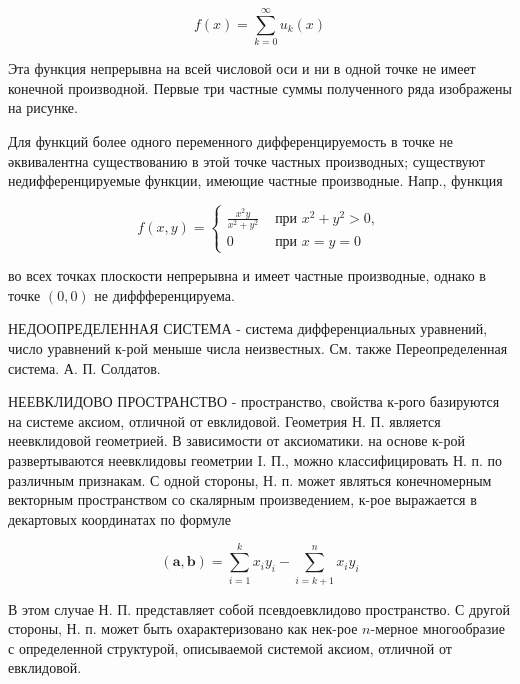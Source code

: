 \documentclass[10pt]{article}
\begin{document}
\[

f(x)=\sum_{k=0}^{\infty} u_{k}(x)

\]



Эта функция непрерывна на всей числовой оси и ни в одной точке не имеет конечной производной. Первые три частные суммы полученного ряда изображены на рисунке.



Для функций более одного переменного дифференцируемость в точке не әквивалентна существованию в этой точке частных производных; существуют недифференцируемые функции, имеющие частные производные. Напр., функция



\[

f(x, y)=\left\{\begin{array}{cl}

\frac{x^{2} y}{x^{2}+y^{2}} & \text { при } x^{2}+y^{2}>0, \\

0 & \text { при } x=y=0

\end{array}\right.

\]



во всех точках плоскости непрерывна и имеет частные производные, однако в точке $(0,0)$ не диффференцируема.



НЕДООПРЕДЕЛЕННАЯ СИСТЕМА - система дифференциальных уравнений, число уравнений к-рой меныше числа неизвестных. См. также Переопределенная система. А. П. Солдатов.



НЕЕВКЛИДОВО ПРОСТРАНСТВО - пространство, свойства к-рого базируются на системе аксиом, отличной от евклидовой. Геометрия Н. П. является неевклидовой геометрией. В зависимости от аксиоматики. на основе к-рой развертываются неевклидовы геометрии I. П., можно классифицировать Н. п. по различным признакам. С одной стороны, Н. п. может являться конечномерным векторным пространством со скалярным произведением, к-рое выражается в декартовых координатах по формуле



\[

(\boldsymbol{a}, \boldsymbol{b})=\sum_{i=1}^{k} x_{i} y_{i}-\sum_{i=k+1}^{n} x_{i} y_{i}

\]



В этом случае Н. П. представляет собой псевдоевклидово пространство. С другой стороны, Н. п. может быть охарактеризовано как нек-рое $n$-мерное многообразие с определенной структурой, описываемой системой аксиом, отличной от евклидовой.
\end{document}
